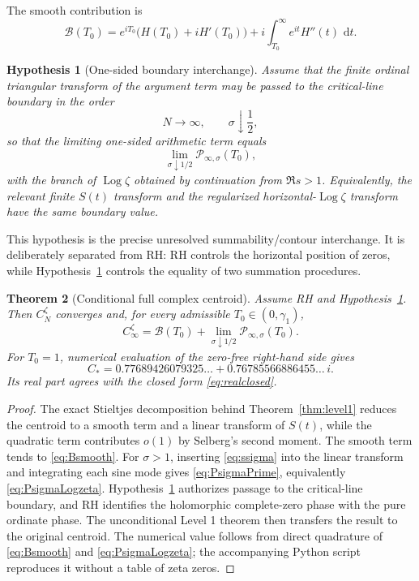 \documentclass[11pt]{article}
\newtheorem{theorem}{Theorem}[section]
\newtheorem{hypothesis}[theorem]{Hypothesis}
\theoremstyle{definition}
\theoremstyle{remark}
\newcommand{\dd}{\,\mathrm d}
\newcommand{\Log}{\operatorname{Log}}
\newcommand{\cP}{\mathcal P}
\newcommand{\cB}{\mathcal B}
\begin{document}
The smooth contribution is
\begin{equation}\label{eq:Bsmooth}
\cB(T_0)
=e^{iT_0}\bigl(H(T_0)+iH'(T_0)\bigr)
+i\int_{T_0}^{\infty}e^{it}H''(t)\,\dd t.
\end{equation}

\begin{hypothesis}[One-sided boundary interchange]\label{hyp:BI}
Assume that the finite ordinal triangular transform of the argument term may be passed to the critical-line boundary in the order
\[
N\to\infty,
\qquad \sigma\downarrow\frac12,
\]
so that the limiting one-sided arithmetic term equals
\[
\lim_{\sigma\downarrow1/2}\cP_{\infty,\sigma}(T_0),
\]
with the branch of $\Log\zeta$ obtained by continuation from $\Re s>1$.  Equivalently, the relevant finite $S(t)$ transform and the regularized horizontal-$\Log\zeta$ transform have the same boundary value.
\end{hypothesis}

This hypothesis is the precise unresolved summability/contour interchange.  It is deliberately separated from RH: RH controls the horizontal position of zeros, while Hypothesis~\ref{hyp:BI} controls the equality of two summation procedures.

\begin{theorem}[Conditional full complex centroid]\label{thm:fullconstant}
Assume RH and Hypothesis~\ref{hyp:BI}.  Then $C_N^{\zeta}$ converges and, for every admissible $T_0\in(0,\gamma_1)$,
\begin{equation}\label{eq:Cfullformula}
\boxed{
C_\infty^{\zeta}
=\cB(T_0)+\lim_{\sigma\downarrow1/2}\cP_{\infty,\sigma}(T_0).
}
\end{equation}
For $T_0=1$, numerical evaluation of the zero-free right-hand side gives
\begin{equation}\label{eq:CstarNumeric}
\boxed{
C_*=
0.77689426079325\ldots
+0.76785566886455\ldots\,i.
}
\end{equation}
Its real part agrees with the closed form \eqref{eq:realclosed}.
\end{theorem}
\begin{proof}
The exact Stieltjes decomposition behind Theorem~\ref{thm:level1} reduces the centroid to a smooth term and a linear transform of $S(t)$, while the quadratic term contributes $o(1)$ by Selberg's second moment.  The smooth term tends to \eqref{eq:Bsmooth}.  For $\sigma>1$, inserting \eqref{eq:ssigma} into the linear transform and integrating each sine mode gives \eqref{eq:PsigmaPrime}, equivalently \eqref{eq:PsigmaLogzeta}.  Hypothesis~\ref{hyp:BI} authorizes passage to the critical-line boundary, and RH identifies the holomorphic complete-zero phase with the pure ordinate phase.  The unconditional Level 1 theorem then transfers the result to the original centroid.  The numerical value follows from direct quadrature of \eqref{eq:Bsmooth} and \eqref{eq:PsigmaLogzeta}; the accompanying Python script reproduces it without a table of zeta zeros.
\end{proof}
\end{document}

